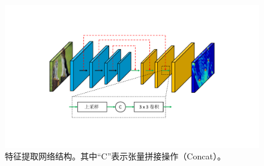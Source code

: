\begin{figure}[t]
	\centering
	\includegraphics[trim={3cm, 3.5cm, 3cm, 3cm}, clip,width=\textwidth]{imgs/feature-extractor.pdf}
	\caption{特征提取网络结构。其中“C”表示张量拼接操作（Concat）。}
	\label{fig:feature_extractor}
\end{figure}
